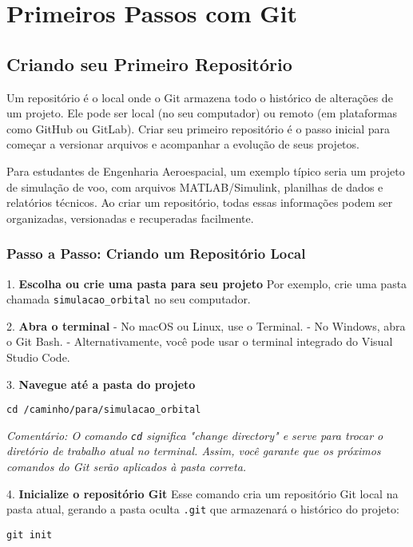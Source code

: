 \newpage
\section{Primeiros Passos com Git}
\subsection{Criando seu Primeiro Repositório}

Um repositório é o local onde o Git armazena todo o histórico de alterações de um projeto. Ele pode ser local (no seu computador) ou remoto (em plataformas como GitHub ou GitLab). Criar seu primeiro repositório é o passo inicial para começar a versionar arquivos e acompanhar a evolução de seus projetos.

Para estudantes de Engenharia Aeroespacial, um exemplo típico seria um projeto de simulação de voo, com arquivos MATLAB/Simulink, planilhas de dados e relatórios técnicos. Ao criar um repositório, todas essas informações podem ser organizadas, versionadas e recuperadas facilmente.

\subsubsection*{Passo a Passo: Criando um Repositório Local}

1. \textbf{Escolha ou crie uma pasta para seu projeto}  
   Por exemplo, crie uma pasta chamada \texttt{simulacao\_orbital} no seu computador.

2. \textbf{Abra o terminal}  
   - No macOS ou Linux, use o Terminal.  
   - No Windows, abra o Git Bash.  
   - Alternativamente, você pode usar o terminal integrado do Visual Studio Code.

3. \textbf{Navegue até a pasta do projeto}


\begin{lstlisting}[style=shellstyle]
cd /caminho/para/simulacao_orbital
\end{lstlisting}


\textit{Comentário: O comando \texttt{cd} significa "change directory" e serve para trocar o diretório de trabalho atual no terminal. Assim, você garante que os próximos comandos do Git serão aplicados à pasta correta.}

4. \textbf{Inicialize o repositório Git}  
   Esse comando cria um repositório Git local na pasta atual, gerando a pasta oculta \texttt{.git} que armazenará o histórico do projeto:
\begin{lstlisting}[style=shellstyle]
git init
\end{lstlisting}

